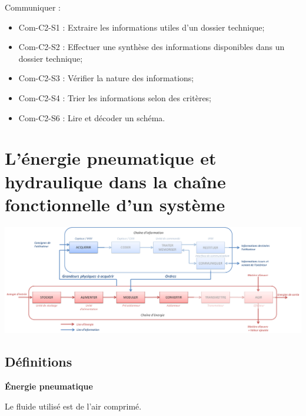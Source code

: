 \documentclass[10pt]{article}
\begin{document}
\begin{savoir}
Communiquer : 
\begin{itemize}
\item Com-C2-S1 : Extraire les informations utiles d’un dossier technique;
\item Com-C2-S2 : Effectuer une synthèse des informations disponibles dans un dossier technique;
\item Com-C2-S3 : Vérifier la nature des informations;
\item Com-C2-S4 : Trier les informations selon des critères;
\item Com-C2-S6 : Lire et décoder un schéma.
\end{itemize}
\end{savoir}


\setlength{\parskip}{0ex plus 0.2ex minus 0ex}
 \renewcommand{\contentsname}{}
 \renewcommand{\baselinestretch}{1}

\tableofcontents

 \renewcommand{\baselinestretch}{1.2}
\setlength{\parskip}{2ex plus 0.5ex minus 0.2ex}



\section{L'énergie pneumatique et hydraulique dans la chaîne fonctionnelle d'un système}

\begin{center}
\includegraphics[width=.95\textwidth]{images/chainefonc}
\end{center}

\subsection{Définitions}
\begin{defi}
\textbf{Énergie pneumatique}

Le fluide utilisé est de l’air comprimé.
\end{defi}
\end{document}
